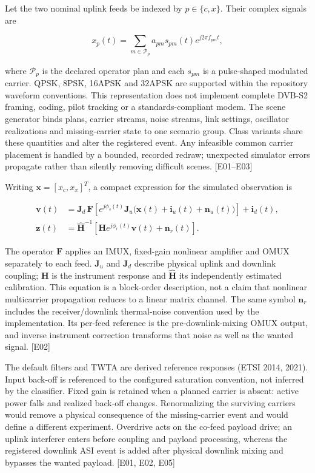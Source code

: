 \documentclass[
  10pt,
]{article}
\begin{document}
Let the two nominal uplink feeds be indexed by \(p\in\{c,x\}\). Their
complex signals are

\[x_p(t)=\sum_{m\in\mathcal P_p}a_{pm}s_{pm}(t)e^{j2\pi f_{pm}t},\]

where \(\mathcal P_p\) is the declared operator plan and each \(s_{pm}\)
is a pulse-shaped modulated carrier. QPSK, 8PSK, 16APSK and 32APSK are
supported within the repository waveform conventions. This
representation does not implement complete DVB-S2 framing, coding, pilot
tracking or a standards-compliant modem. The scene generator binds
plans, carrier streams, noise streams, link settings, oscillator
realizations and missing-carrier state to one scenario group. Class
variants share these quantities and alter the registered event. Any
infeasible common carrier placement is handled by a bounded, recorded
redraw; unexpected simulator errors propagate rather than silently
removing difficult scenes. {[}E01--E03{]}

Writing \(\mathbf x=[x_c,x_x]^T\), a compact expression for the
simulated observation is

\[\begin{aligned}
\mathbf v(t)&=\mathbf J_d\,\mathbf F\!\left[e^{j\phi_s(t)}\mathbf J_u\big(\mathbf x(t)+\mathbf i_u(t)+\mathbf n_u(t)\big)\right]+\mathbf i_d(t),\\
\mathbf z(t)&=\widehat{\mathbf H}^{-1}\!\left[\mathbf H e^{j\phi_r(t)}\mathbf v(t)+\mathbf n_r(t)\right].
\end{aligned}\]

The operator \(\mathbf F\) applies an IMUX, fixed-gain nonlinear
amplifier and OMUX separately to each feed. \(\mathbf J_u\) and
\(\mathbf J_d\) describe physical uplink and downlink coupling;
\(\mathbf H\) is the instrument response and \(\widehat{\mathbf H}\) its
independently estimated calibration. This equation is a block-order
description, not a claim that nonlinear multicarrier propagation reduces
to a linear matrix channel. The same symbol \(\mathbf n_r\) includes the
receiver/downlink thermal-noise convention used by the implementation.
Its per-feed reference is the pre-downlink-mixing OMUX output, and
inverse instrument correction transforms that noise as well as the
wanted signal. {[}E02{]}

The default filters and TWTA are derived reference responses (ETSI 2014,
2021). Input back-off is referenced to the configured saturation
convention, not inferred by the classifier. Fixed gain is retained when
a planned carrier is absent: active power falls and realized back-off
changes. Renormalizing the surviving carriers would remove a physical
consequence of the missing-carrier event and would define a different
experiment. Overdrive acts on the co-feed payload drive; an uplink
interferer enters before coupling and payload processing, whereas the
registered downlink ASI event is added after physical downlink mixing
and bypasses the wanted payload. {[}E01, E02, E05{]}
\end{document}
